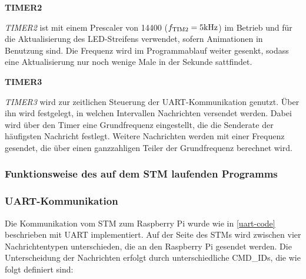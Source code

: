 \documentclass[12pt, a4paper]{report}
\begin{document}
         \textbf{TIMER2}

         \textit{TIMER2} ist mit einem Prescaler von 14400 ($f_{\mathrm{TIM2}}=5\si[]{\kilo\hertz}$) im Betrieb und für die Aktualisierung des LED-Streifens verwendet, sofern Animationen in Benutzung sind. Die Frequenz wird im Programmablauf weiter gesenkt, sodass eine Aktualisierung nur noch wenige Male in der Sekunde sattfindet.

         \textbf{TIMER3}

         \textit{TIMER3} wird zur zeitlichen Steuerung der UART-Kommunikation genutzt. Über ihn wird festgelegt, in welchen Intervallen Nachrichten versendet werden. Dabei wird über den Timer eine Grundfrequenz eingestellt, die die Senderate der häufigsten Nachricht festlegt.
         Weitere Nachrichten werden mit einer Frequenz gesendet, die über einen ganzzahligen Teiler der Grundfrequenz berechnet wird.
         \newpage
         \subsubsection{Funktionsweise des auf dem STM laufenden Programms}
            \subsubsection{UART-Kommunikation}
                 Die Kommunikation vom STM zum Raspberry Pi wurde wie in \ref{uart-code} beschrieben mit UART implementiert. Auf der Seite des STMs wird zwischen vier Nachrichtentypen unterschieden, die an den Raspberry Pi gesendet werden. Die Unterscheidung der Nachrichten erfolgt durch unterschiedliche CMD\_IDs, die wie folgt definiert sind:
   
\end{document}
